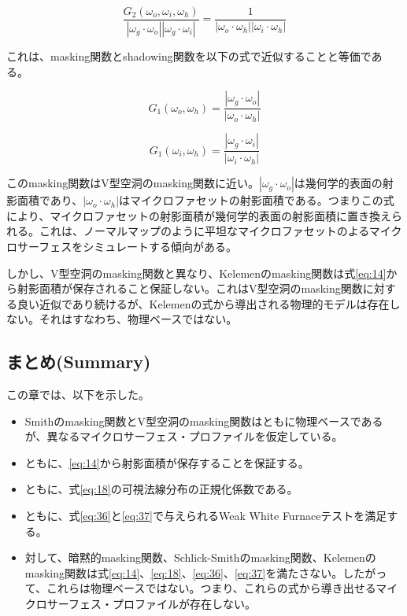 \documentclass[a4j,xelatex,ja=standard]{bxjsarticle}
\begin{document}
\begin{equation}
    \frac{G_2(\omega_o, \omega_i, \omega_h)}{|\omega_g \cdot \omega_o| |\omega_g \cdot \omega_i|} = \frac{1}{|\omega_o \cdot \omega_h| |\omega_i \cdot \omega_h|}
    \label{eq:58}
\end{equation}

これは、masking関数とshadowing関数を以下の式で近似することと等価である。

\begin{equation}
    G_1(\omega_o, \omega_h) = \frac{|\omega_g \cdot \omega_o|}{|\omega_o \cdot \omega_h|}
    \label{eq:59}
\end{equation}

\begin{equation}
    G_1(\omega_i, \omega_h) = \frac{|\omega_g \cdot \omega_i|}{|\omega_i \cdot \omega_h|}
    \label{eq:60}
\end{equation}

このmasking関数はV型空洞のmasking関数に近い。$|\omega_g \cdot \omega_o|$は幾何学的表面の射影面積であり、$|\omega_o \cdot \omega_h|$はマイクロファセットの射影面積である。つまりこの式により、マイクロファセットの射影面積が幾何学的表面の射影面積に置き換えられる。これは、ノーマルマップのように平坦なマイクロファセットのよるマイクロサーフェスをシミュレートする傾向がある。

しかし、V型空洞のmasking関数と異なり、Kelemenのmasking関数は式\eqref{eq:14}から射影面積が保存されること保証しない。これはV型空洞のmasking関数に対する良い近似であり続けるが、Kelemenの式から導出される物理的モデルは存在しない。それはすなわち、物理ベースではない。

\subsection{まとめ(Summary)}

この章では、以下を示した。

\begin{itemize}
    \item Smithのmasking関数とV型空洞のmasking関数はともに物理ベースであるが、異なるマイクロサーフェス・プロファイルを仮定している。
    \item ともに、\eqref{eq:14}から射影面積が保存することを保証する。
    \item ともに、式\eqref{eq:18}の可視法線分布の正規化係数である。
    \item ともに、式\eqref{eq:36}と\eqref{eq:37}で与えられるWeak White Furnaceテストを満足する。
    \item 対して、暗黙的masking関数、Schlick-Smithのmasking関数、Kelemenのmasking関数は式\eqref{eq:14}、\eqref{eq:18}、\eqref{eq:36}、\eqref{eq:37}を満たさない。したがって、これらは物理ベースではない。つまり、これらの式から導き出せるマイクロサーフェス・プロファイルが存在しない。
\end{itemize}
\end{document}
